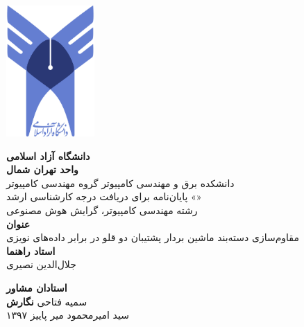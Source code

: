 \thispagestyle{empty}

\centerline{\includegraphics[height=5cm]{logo.png}}

\begin{center}
\vspace{0.5cm}

\textbf{دانشگاه آزاد اسلامی}
\\[.2cm]
\textbf{واحد تهران شمال}
\\[0.5cm]

دانشکده برق و مهندسی کامپیوتر گروه مهندسی کامپیوتر
\\[.5cm]
پایان‌نامه برای دریافت درجه کارشناسی ارشد «»
\\[.2cm]
رشته مهندسی کامپیوتر، گرایش هوش مصنوعی
\\[0.5cm]

{\Large
\textbf{عنوان}
}
\\
مقاوم‌سازی دسته‌بند ماشین بردار پشتیبان دو قلو در برابر داده‌های نویزی
\\[0.5cm]

{\Large
	\textbf{استاد راهنما}
}
\\
جلال‌ا‌لدین نصیری
\vskip 0.5cm

{\Large
	\textbf{استادان مشاور}
}
\\
سمیه فتاحی
\vskip 0.5cm
{\Large
	\textbf{نگارش}
}
\\
سید امیرمحمود میر
\vskip 0.5cm
پاییز ۱۳۹۷
\end{center}